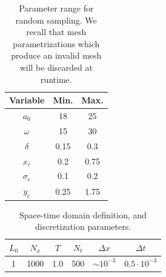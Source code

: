 \documentclass[../../thesis.tex]{subfiles}
\begin{document}
\begin{table}[h]
    \centering
    \caption{Parameter range for random sampling.
    We recall that mesh parametrizations which produce an invalid mesh
    will be discarded at runtime.}
    \begin{tabular}{ccc}
    \toprule
        Variable   & Min. & Max. \\ 
        \midrule
        $a_0$      & 18      & 25      \\
        $\omega$   & 15      & 30      \\
        $\delta$   & 0.15    & 0.3     \\
        \midrule
        $x_c$      & 0.2     & 0.75    \\
        $\sigma_c$ & 0.1     & 0.2     \\
        $y_c$      & 0.25    & 1.75    \\ 
        \bottomrule
    \end{tabular}
    \label{tab:parameter_range}
\end{table}

\begin{table}[h]
    \centering
    \caption{Space-time domain definition, and discretization parameters.}
    \begin{tabular}{cccccc}
        \toprule
        $L_0$ & $N_x$      & $T$ & $N_t$  & $\Delta x$     & $\Delta t$          \\ \midrule
        1     & 1000       & 1.0 & 500    & $\sim 10^{-3}$ & $0.5 \cdot 10^{-3}$  \\
        \bottomrule
    \end{tabular}
    \label{tab:discretization_parameters}
\end{table}
\end{document}
